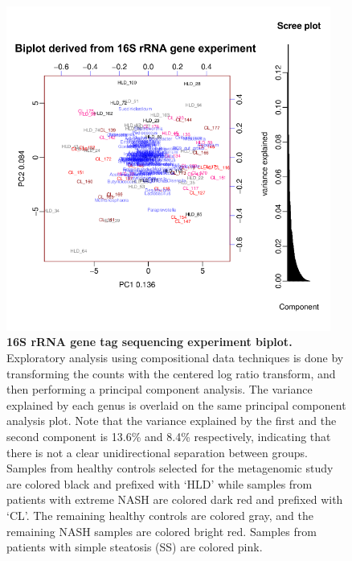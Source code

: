 \begin{figure}[h]
\begin{center}
\includegraphics[width=0.95\textwidth]{nafld_16s_biplot.png}
\caption[16S rRNA gene tag sequencing experiment biplot.]{\textbf{16S rRNA gene tag sequencing experiment biplot.} Exploratory analysis using compositional data techniques is done by transforming the counts with the centered log ratio transform, and then performing a principal component analysis. The variance explained by each genus is overlaid on the same principal component analysis plot. Note that the variance explained by the first and the second component is 13.6\% and 8.4\% respectively, indicating that there is not a clear unidirectional separation between groups. Samples from healthy controls selected for the metagenomic study are colored black and prefixed with `HLD' while samples from patients with extreme NASH are colored dark red and prefixed with `CL'. The remaining healthy controls are colored gray, and the remaining NASH samples are colored bright red. Samples from patients with simple steatosis (SS) are colored pink.}
\label{nafld_16s_biplot}
\end{center}
\end{figure}

